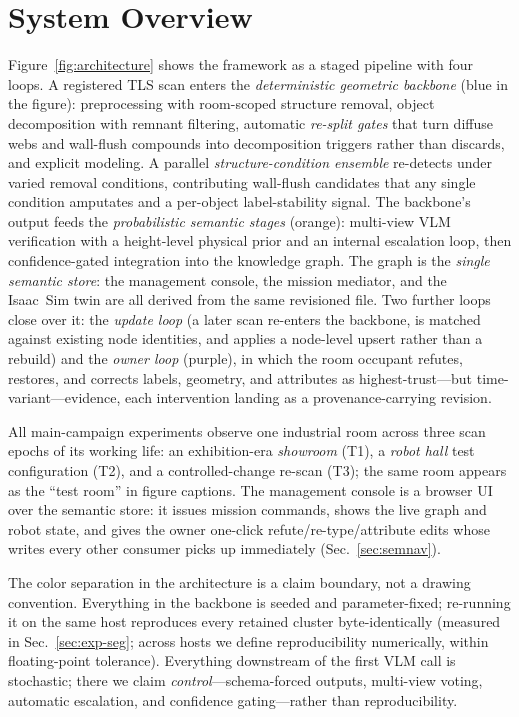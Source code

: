 \section{System Overview}
\label{sec:overview}

Figure~\ref{fig:architecture} shows the framework as a staged pipeline with
four loops. A registered TLS scan enters the \emph{deterministic geometric
backbone} (blue in the figure): preprocessing with room-scoped structure
removal, object decomposition with remnant filtering, automatic
\emph{re-split gates} that turn diffuse webs and wall-flush compounds into
decomposition triggers rather than discards, and explicit modeling. A
parallel \emph{structure-condition ensemble} re-detects under varied
removal conditions, contributing wall-flush candidates that any single
condition amputates and a per-object label-stability signal. The backbone's
output feeds the \emph{probabilistic semantic stages} (orange): multi-view
VLM verification with a height-level physical prior and an internal
escalation loop, then confidence-gated integration into the knowledge
graph. The graph is the \emph{single semantic store}: the management
console, the mission mediator, and the Isaac~Sim twin are all derived from
the same revisioned file. Two further loops close over it: the
\emph{update loop} (a later scan re-enters the backbone, is matched
against existing node identities, and applies a node-level upsert rather
than a rebuild) and the \emph{owner loop} (purple), in which the room
occupant refutes, restores, and corrects labels, geometry, and attributes
as highest-trust---but time-variant---evidence, each intervention landing
as a provenance-carrying revision.

All main-campaign experiments observe one industrial room across three
scan epochs of
its working life: an exhibition-era \emph{showroom} (T1), a
\emph{robot hall} test configuration (T2), and a controlled-change
re-scan (T3); the same room appears as the ``test room'' in figure
captions. The management console is a browser UI over the semantic
store: it issues mission commands, shows the live graph and robot state,
and gives the owner one-click refute/re-type/attribute edits whose
writes every other consumer picks up immediately
(Sec.~\ref{sec:semnav}).

The color separation in the architecture is a claim boundary, not a drawing
convention. Everything in the backbone is seeded and parameter-fixed;
re-running it on the same host reproduces every retained cluster
byte-identically (measured in Sec.~\ref{sec:exp-seg}; across hosts we define reproducibility
numerically, within floating-point tolerance). Everything downstream of the
first VLM call is stochastic; there we claim \emph{control}---schema-forced
outputs, multi-view voting, automatic escalation, and confidence
gating---rather than reproducibility.


